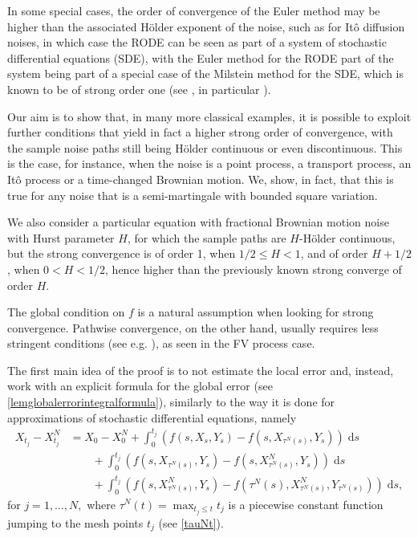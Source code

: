 \documentclass[reqno,12pt]{amsart}
\theoremstyle{plain} %
\theoremstyle{definition} %
\begin{document}
In some special cases, the order of convergence of the Euler method may be higher than the associated H\"older exponent of the noise, such as for It\^o diffusion noises, in which case the RODE can be seen as part of a system of stochastic differential equations (SDE), with the Euler method for the RODE part of the system being part of a special case of the Milstein method for the SDE, which is known to be of strong order one (see \cite[Section 5]{WangCaoHanKloeden2021}, in particular \cite[Section 5.2, Example 12 and Remark 13]{WangCaoHanKloeden2021}).

Our aim is to show that, in many more classical examples, it is possible to exploit further conditions that yield in fact a higher strong order of convergence, with the sample noise paths still being H\"older continuous or even discontinuous. This is the case, for instance, when the noise is a point process, a transport process, an It\^o process or a time-changed Brownian motion. We, show, in fact, that this is true for any noise that is a semi-martingale with bounded square variation.

We also consider a particular equation with fractional Brownian motion noise with Hurst parameter $H$, for which the sample paths are $H$-H\"older continuous, but the strong convergence is of order 1, when $1/2 \leq H < 1$, and of order $H + 1/2$, when $0 < H < 1/2$, hence higher than the previously known strong converge of order $H.$

The global condition on $f$ is a natural assumption when looking for strong convergence. Pathwise convergence, on the other hand, usually requires less stringent conditions (see e.g. \cite{JentzenKloedenNeuenkirch2009, JentzenKloeden2011}), as seen in the FV process case.

The first main idea of the proof is to not estimate the local error and, instead, work with an explicit formula for the global error (see \cref{lemglobalerrorintegralformula}), similarly to the way it is done for approximations of stochastic differential equations, namely
\begin{equation}
    \label{lemglobalerrorintegralformulaintro}
    \begin{aligned}
        X_{t_j} - X_{t_j}^N & = X_0 - X_0^N + \int_0^{t_j} \left( f(s, X_s, Y_s) - f(s, X_{\tau^N(s)}, Y_s) \right)\;\mathrm{d}s  \\ 
        & \qquad + \int_{0}^{t_j} \left( f(s, X_{\tau^N(s)}, Y_s) - f(s, X_{\tau^N(s)}^N, Y_s) \right)\;\mathrm{d}s \\
        & \qquad + \int_0^{t_j} \left( f(s, X_{\tau^N(s)}^N, Y_s) - f(\tau^N(s), X_{\tau^N(s)}^N, Y_{\tau^N(s)}) \right)\;\mathrm{d}s,
    \end{aligned}
\end{equation}
for $j = 1, \ldots, N,$ where $\tau^N(t) = \max_{t_j \leq t} t_j$ is a piecewise constant function jumping to the mesh points $t_j$ (see \eqref{tauNt}).
\end{document}
